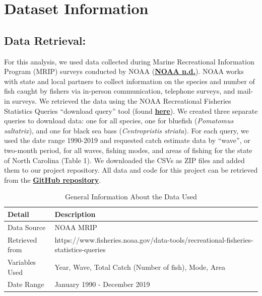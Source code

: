 \documentclass[
  12pt,
]{article}
\begin{document}
\newpage

\hypertarget{dataset-information}{%
\section{Dataset Information}\label{dataset-information}}

\hypertarget{data-retrieval}{%
\subsection{Data Retrieval:}\label{data-retrieval}}

For this analysis, we used data collected during Marine Recreational
Information Program (MRIP) surveys conducted by NOAA
(\href{https://www.fisheries.noaa.gov/recreational-fishing-data/about-marine-recreational-information-program}{\textbf{NOAA
n.d.}}). NOAA works with state and local partners to collect information
on the species and number of fish caught by fishers via in-person
communication, telephone surveys, and mail-in surveys. We retrieved the
data using the NOAA Recreational Fisheries Statistics Queries ``download
query'' tool (found
\href{https://www.fisheries.noaa.gov/data-tools/recreational-fisheries-statistics-queries}{\textbf{here}}).
We created three separate queries to download data: one for all species,
one for bluefish (\emph{Pomatomus saltatrix}), and one for black sea
bass (\emph{Centropristis striata}). For each query, we used the date
range 1990-2019 and requested catch estimate data by ``wave'', or
two-month period, for all waves, fishing modes, and areas of fishing for
the state of North Carolina (Table 1). We downloaded the CSVs as ZIP
files and added them to our project repository. All data and code for
this project can be retrieved from the
\href{https://github.com/ardathdixon/Data_FinalProject}{\textbf{GitHub
repository}}.

\begin{table}[H]

\caption{\label{tab:table1}General Information About the Data Used}
\centering
\begin{tabular}[t]{l|>{\raggedright\arraybackslash}p{5in}}
\hline
Detail & Description\\
\hline
Data Source & NOAA MRIP\\
\hline
Retrieved from & https://www.fisheries.noaa.gov/data-tools/recreational-fisheries-statistics-queries\\
\hline
Variables Used & Year, Wave, Total Catch (Number of fish), Mode, Area\\
\hline
Date Range & January 1990 - December 2019\\
\hline
\end{tabular}
\end{table}
\end{document}

